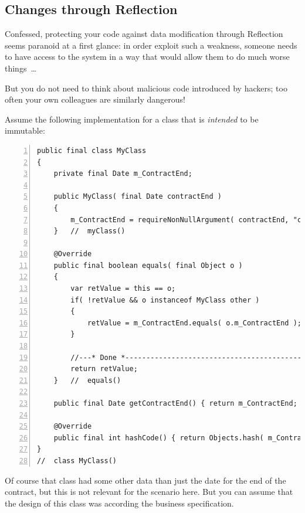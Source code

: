 \documentclass[11pt,a4paper, titlepage, parskip=half, headsepline, footsepline, cleardoublepage=current, headheight=1cm]{scrbook}
\begin{document}

\subsection{Changes through Reflection}\label{sec:ChangesThroughReflection}
Confessed, protecting your code against data modification through Reflection seems paranoid at a first glance: in order exploit such a weakness, someone needs to have access to the system in a way that would allow them to do much worse things~…

But you do not need to think about malicious code introduced by hackers; too often your own colleagues are similarly dangerous!

Assume the following implementation for a class that is \textit{intended} to be immutable:
\begin{lstlisting}[numbers=left]
public final class MyClass
{
    private final Date m_ContractEnd;
    
    public MyClass( final Date contractEnd )
    {
        m_ContractEnd = requireNonNullArgument( contractEnd, "contractEnd" ).clone();
    }   //  myClass()
    
    @Override
    public final boolean equals( final Object o )
    {
        var retValue = this == o;
        if( !retValue && o instanceof MyClass other )
        {
            retValue = m_ContractEnd.equals( o.m_ContractEnd );
        }
        
        //---* Done *------------------------------------------------
        return retValue;
    }   //  equals()
    
    public final Date getContractEnd() { return m_ContractEnd; }
    
    @Override
    public final int hashCode() { return Objects.hash( m_ContractDate ); }
}
//  class MyClass()
\end{lstlisting}

Of course that class had some other data than just the date for the end of the contract, but this is not relevant for the scenario here. But you can assume that the design of this class was according the business specification.
\end{document}
